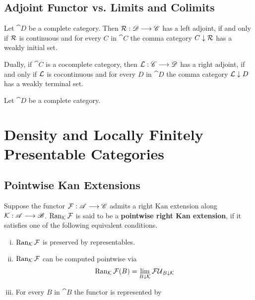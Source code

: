 	\subsection{Adjoint Functor vs. Limits and Colimits}

	\begin{proposition}
	\end{proposition}

	\begin{theorem}
		Let $\cat{D}$ be a complete category. Then $\mathcal{R}: \mathscr{D} --> \mathscr{C}$ has a left adjoint, if and only if $\mathcal{R}$ is continuous and for every $C$ in $\cat{C}$ the comma category $C \downarrow \mathcal{R}$ has a weakly initial set.

		Dually, if $\cat{C}$ is a cocomplete category, then $\mathcal{L}: \mathscr{C} --> \mathscr{D}$ has a right adjoint, if and only if $\mathcal{L}$ is cocontinuous and for every $D$ in $\cat{D}$ the comma category $\mathcal{L} \downarrow D$ has a weakly terminal set.
	\end{theorem}

	\begin{theorem}
		Let $\cat{D}$ be a complete category. 
	\end{theorem}

	\newpage
	\section{Density and Locally Finitely Presentable Categories}
	\subsection{Pointwise Kan Extensions}

	\begin{definition}
		Suppose the functor $\mathcal{F}:\mathscr{A} --> \mathscr{C}$ admits a right Kan extension along $\mathcal{K}:\mathscr{A} --> \mathscr{B}$. $\operatorname{Ran}_{\mathcal{K}}\mathcal{F}$ is said to be a \textbf{pointwise right Kan extension}, if it satisfies one of the following equivalent conditions.
		\begin{enumerate}[(i)]
			\item{
				$\operatorname{Ran}_{\mathcal{K}}\mathcal{F}$ is preserved by representables.
			}
			\item{
				$\operatorname{Ran}_{\mathcal{K}}\mathcal{F}$ can be computed pointwise via
				\begin{align*}
					\operatorname{Ran}_{\mathcal{K}}\mathcal{F}(B) = \lim_{B \downarrow \mathcal{K}} \mathcal{FU}_{B \downarrow \mathcal{K}}
				\end{align*}
			}
			\item{
				For every $B$ in $\cat{B}$ the functor  is represented by 
			}
		\end{enumerate}
	\end{definition}

